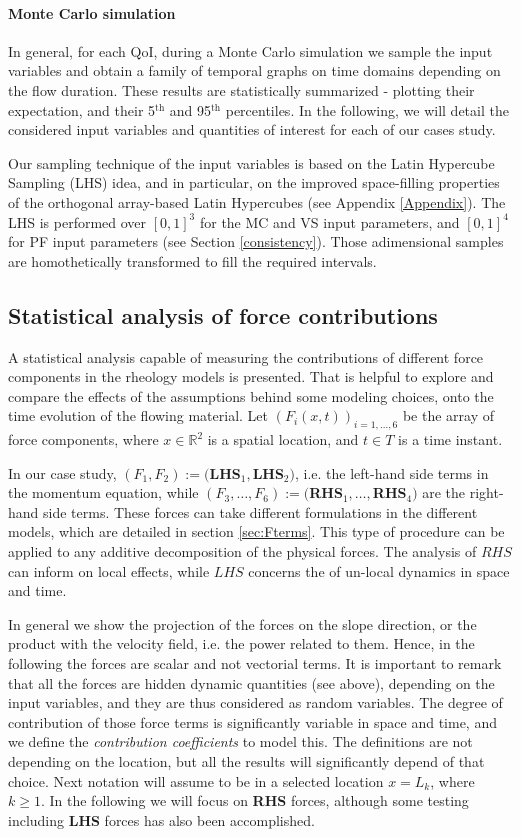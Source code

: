 \documentclass{article}
\begin{document}
\paragraph{Monte Carlo simulation} In general, for each QoI, during a Monte Carlo simulation we sample the input variables and obtain a family of temporal graphs on time domains depending on the flow duration. These results are statistically summarized - plotting their expectation, and their 5$^{\mathrm{th}}$ and 95$^{\mathrm{th}}$ percentiles. In the following, we will detail the considered input variables and quantities of interest for each of our cases study.

Our sampling technique of the input variables is based on the Latin Hypercube Sampling (LHS) idea, and in particular, on the improved space-filling properties of the orthogonal array-based Latin Hypercubes (see Appendix \ref{Appendix}). The LHS is performed over $[0,1]^3$ for the MC and VS input parameters, and $[0,1]^4$ for PF input parameters (see Section \ref{consistency}). Those adimensional samples are homothetically transformed to fill the required intervals.

\subsection{Statistical analysis of force contributions}\label{statF}
A statistical analysis capable of measuring the contributions of different force components in the rheology models is presented. That is helpful to explore and compare the effects of the assumptions behind some modeling choices, onto the time evolution of the flowing material. Let $(F_i(x,t))_{i=1,\dots, 6}$ be the array of force components, where $x\in\mathbb R^2$ is a spatial location, and $t\in T$ is a time instant.

In our case study, $(F_1,F_2):=($\textbf{LHS}$_1,$\textbf{LHS}$_2)$, i.e. the left-hand side terms in the momentum equation, while $(F_3,\dots,F_6):=($\textbf{RHS}$_1,\dots,$\textbf{RHS}$_4)$ are the right-hand side terms. These forces can take different formulations in the different models, which are detailed in section \ref{sec:Fterms}. This type of procedure can be applied to any additive decomposition of the physical forces. The analysis of $RHS$ can inform on local effects, while $LHS$ concerns the of un-local dynamics in space and time.

In general we show the projection of the forces on the slope direction, or the product with the velocity field, i.e. the power related to them. Hence, in the following the forces are scalar and not vectorial terms. It is important to remark that all the forces are hidden dynamic quantities (see above), depending on the input variables, and they are thus considered as random variables. The degree of contribution of those force terms is significantly variable in space and time, and we define the \emph{contribution coefficients} to model this. The definitions are not depending on the location, but all the results will significantly depend of that choice. Next notation will assume to be in a selected location $x=L_k$, where $k\ge 1$. In the following we will focus on \textbf{RHS} forces, although some testing including \textbf{LHS} forces has also been accomplished.
\end{document}
